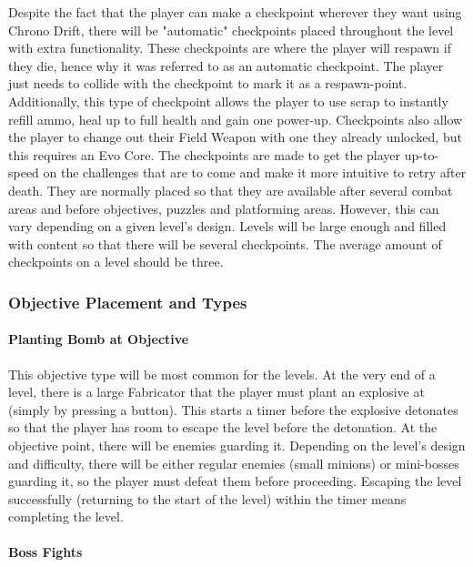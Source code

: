 \documentclass[12pt]{article}
\begin{document}
Despite the fact that the player can make a checkpoint wherever they want using Chrono Drift, there will be "automatic" checkpoints placed throughout the level with extra functionality. These checkpoints are where the player will respawn if they die, hence why it was referred to as an automatic checkpoint. The player just needs to collide with the checkpoint to mark it as a respawn-point. Additionally, this type of checkpoint allows the player to use scrap to instantly refill ammo, heal up to full health and gain one power-up. Checkpoints also allow the player to change out their Field Weapon with one they already unlocked, but this requires an Evo Core. The checkpoints are made to get the player up-to-speed on the challenges that are to come and make it more intuitive to retry after death. They are normally placed so that they are available after several combat areas and before objectives, puzzles and platforming areas. However, this can vary depending on a given level's design. Levels will be large enough and filled with content so that there will be several checkpoints. The average amount of checkpoints on a level should be three. 

\subsubsection{Objective Placement and Types}

\paragraph{Planting Bomb at Objective}

This objective type will be most common for the levels. At the very end of a level, there is a large Fabricator that the player must plant an explosive at (simply by pressing a button). This starts a timer before the explosive detonates so that the player has room to escape the level before the detonation. At the objective point, there will be enemies guarding it. Depending on the level's design and difficulty, there will be either regular enemies (small minions) or mini-bosses guarding it, so the player must defeat them before proceeding. Escaping the level successfully (returning to the start of the level) within the timer means completing the level. 

\paragraph{Boss Fights}
\end{document}
